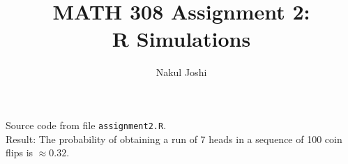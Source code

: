 \documentclass{article}
\title{MATH 308 Assignment 2:\\R Simulations}
\author{Nakul Joshi}
\begin{document}
\lstset{language=R,basicstyle=\ttfamily\footnotesize}
\maketitle

\noindent Source code from file \lstinline{assignment2.R}.\\
Result: The probability of obtaining a run of 7 heads in a sequence of 100 coin flips is $\approx 0.32$.
\end{document}
